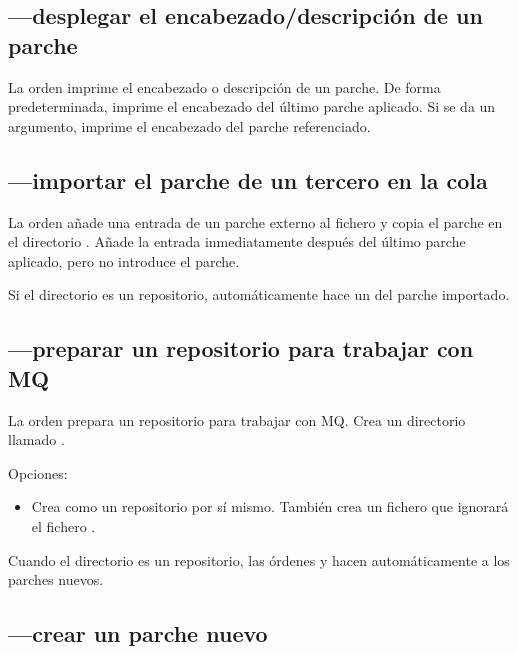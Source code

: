 \subsection{---desplegar el encabezado/descripción
  de un parche}

La orden  imprime el encabezado o descripción de
un parche.  De forma predeterminada, imprime el encabezado del último
parche aplicado. Si se da un argumento, imprime el encabezado del
parche referenciado.

\subsection{---importar el parche de un tercero en
  la cola}

La orden  añade una entrada de un parche externo
al fichero  y copia el parche en el directorio
.  Añade la entrada inmediatamente después del
último parche aplicado, pero no introduce el parche.

Si el directorio  es un repositorio, 
 automáticamente hace un  del parche
importado.

\subsection{---preparar un repositorio para trabajar
  con MQ}

La orden  prepara un repositorio para trabajar con
MQ.  Crea un directorio llamado .

Opciones:
\begin{itemize}
\item[\hgxopt{mq}{qinit}{-c}] Crea  como un
  repositorio por sí mismo.  También crea un fichero
   que ignorará el fichero .
\end{itemize}

Cuando el directorio  es un repositorio, las órdenes
 y  hacen 
automáticamente a los parches nuevos.

\subsection{---crear un parche nuevo}

